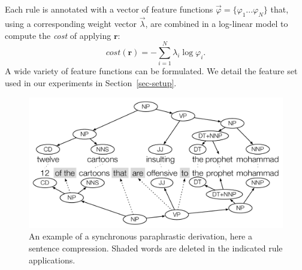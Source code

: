 \documentclass[11pt]{article}
\begin{document}
Each rule is annotated with a vector of feature functions
$\vec{\varphi} = \{\varphi_1 ... \varphi_N \}$ that, using a
corresponding weight vector $\vec{\lambda}$, are combined in a
log-linear model to compute the \emph{cost} of applying $\mathbf{r}$:
\begin{equation}
  \mathit{cost}(\mathbf{r}) = -\sum_{i=1}^N \lambda_i \log \varphi_i .
\end{equation}
A wide variety of feature functions can be formulated. We detail the
feature set used in our experiments in Section~\ref{sec-setup}.

\begin{figure}[!t]
\begin{center}
\includegraphics[width=0.99\linewidth]{figures/example_compression.pdf}
\end{center}
\caption{An example of a synchronous paraphrastic derivation, here a
  sentence compression. Shaded words are deleted in the indicated rule
  applications.}
\label{fig-example-compression}
\end{figure}
\end{document}
